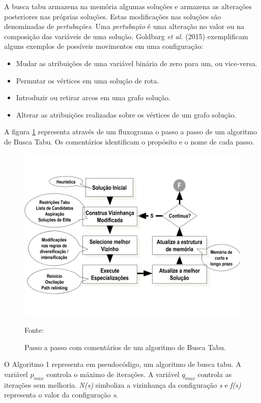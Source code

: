 A busca tabu armazena na memória algumas soluções e armazena as alterações posteriores nas próprias soluções. Estas modificações nas soluções são denominadas de \emph{pertubações}. Uma \emph{pertubação} é uma alteração no valor ou na composição das variáveis de uma solução. Goldbarg \emph{et al.} (2015) exemplificam alguns exemplos de possíveis movimentos em uma configuração:

\begin{itemize}
    \item Mudar as atribuições de uma variável binária de zero para um, ou vice-versa.
    \item Permutar os vértices em uma solução de rota.
    \item Introduzir ou retirar arcos em uma grafo solução.
    \item Alterar as atribuições realizadas sobre os vértices de um grafo solução.
\end{itemize}

A figura \ref{taboo-image} representa através de um fluxograma o passo a passo de um algoritmo de Busca Tabu. Os comentários identificam o propósito e o nome de cada passo. 


\begin{figure}[H]
  \centering
  \caption{Passo a passo com comentários de um algoritmo de Busca Tabu.}
 \includegraphics[scale=0.4]{imagens/tabu.png} \par
\bigskip
    Fonte: \cite[p. 97]{goldbarg}
    \label{taboo-image}
\end{figure}

O Algoritmo 1 representa em pseudocódigo, um algoritmo de busca tabu. A variável $p_{max}$ controla o máximo de iterações. A variável $q_{max}$ controla as iterações sem melhoria. \emph{N(s)} simboliza a vizinhança da configuração \emph{s} e \emph{f(s)} representa o valor da configuração \emph{s}.

